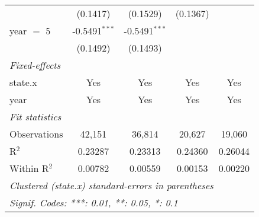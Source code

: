 \begin{tabular}{lcccc}
                & (0.1417)        & (0.1529)        & (0.1367)        &   \\   
   year $=$ 5   & -0.5491$^{***}$ & -0.5491$^{***}$ &                 &   \\   
                & (0.1492)        & (0.1493)        &                 &   \\   
   \midrule
   \emph{Fixed-effects}\\
   state.x      & Yes             & Yes             & Yes             & Yes\\  
   year         & Yes             & Yes             & Yes             & Yes\\  
   \midrule
   \emph{Fit statistics}\\
   Observations & 42,151          & 36,814          & 20,627          & 19,060\\  
   R$^2$        & 0.23287         & 0.23313         & 0.24360         & 0.26044\\  
   Within R$^2$ & 0.00782         & 0.00559         & 0.00153         & 0.00220\\  
   \midrule \midrule
   \multicolumn{5}{l}{\emph{Clustered (state.x) standard-errors in parentheses}}\\
   \multicolumn{5}{l}{\emph{Signif. Codes: ***: 0.01, **: 0.05, *: 0.1}}\\
\end{tabular}
\par\endgroup



